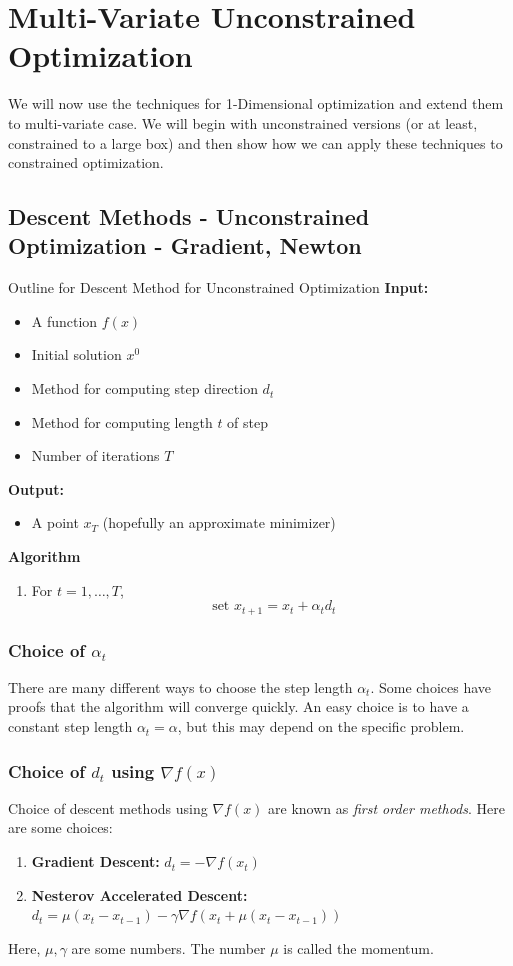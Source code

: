 \section{Multi-Variate Unconstrained Optimization}
We will now use the techniques for 1-Dimensional optimization and extend them to multi-variate case.  We will begin with unconstrained versions (or at least, constrained to a large box) and then show how we can apply these techniques to constrained optimization.

\subsection{Descent Methods - Unconstrained Optimization - Gradient, Newton} 

\begin{general}{Outline for Descent Method for Unconstrained Optimization}{}
\textbf{Input:} 
\begin{itemize}
\item A function $f(x)$
\item Initial solution $x^0$
\item Method for computing step direction $d_t$
\item Method for computing length $t$ of step
\item Number of iterations $T$
\end{itemize}

\textbf{Output:}
\begin{itemize}
\item A point $x_{T}$ (hopefully an approximate minimizer)
\end{itemize}

\textbf{Algorithm}
\begin{enumerate}
\item For $t=1, \dots, T$,
$$
\text{ set } x_{t+1} = x_t + \alpha_t d_t 
$$
\end{enumerate}

\end{general}
\subsubsection{Choice of $\alpha_t$}
There are many different ways to choose the step length $\alpha_t$.  Some choices have proofs that the algorithm will converge quickly.  An easy choice is to have a constant step length $\alpha_t = \alpha$, but this may depend on the specific problem.

\subsubsection{Choice of $d_t$ using $\nabla f(x)$}
Choice of descent methods using $\nabla f(x)$ are known as \emph{first order methods}.
Here are some choices:
\begin{enumerate}
\item \textbf{Gradient Descent:}   $d_t = - \nabla f(x_t)$
\item \textbf{Nesterov Accelerated Descent:} $d_t = \mu (x_t - x_{t-1}) - \gamma \nabla f(x_t + \mu(x_t- x_{t-1}))$
\end{enumerate}
Here, $\mu, \gamma$ are some numbers.  The number $\mu$ is called the momentum.  

